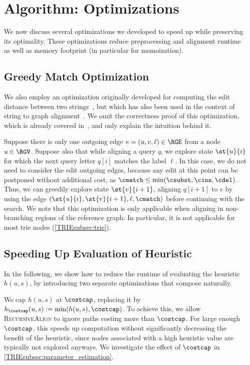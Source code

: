 \section{\astarix Algorithm: Optimizations} \label{TRIEsec:optimizations}
We now discuss several optimizations we developed to speed up \astarix while
preserving its optimality. These optimizations reduce preprocessing and
alignment runtime as well as memory footprint (in particular for memoization).



\subsection{Greedy Match Optimization} \label{TRIEsubsec:greedy}
We also employ an optimization originally developed for computing the edit
distance between two strings~\cite{sellers_algorithm_1974,allison_lazy_1992}, but
which has also been used in the context of string to graph
alignment~\cite{dox2018efficient}. We omit the correctness proof of this
optimization, which is already covered
in~\cite{sellers_algorithm_1974}, and only explain the intuition behind it.

Suppose there is only one outgoing edge $e = (u, v, \ell) \in \RGE$ from a node
$u \in \RGV$. Suppose also that while aligning a query $q$, we explore state
$\st{u}{i}$ for which the next query letter $q[i]$ matches the label $\ell$. In
this case, we do not need to consider the edit outgoing edges, because
any edit at this point can be postponed without additional cost, as $\cmatch
\leq \min(\csubst, \cins, \cdel)$. Thus, we can greedily explore state
$\st{v}{i+1}$, aligning $q[i+1]$ to $e$ by using the edge $(\st{u}{i},
\st{v}{i+1}, \ell, \cmatch)$ before continuing with the \A search.
We note that this optimization is only applicable when aligning in non-branching
regions of the reference graph. In particular, it is not applicable for most
trie nodes (\cref{TRIEsubsec:trie}).

\subsection{Speeding Up Evaluation of Heuristic} \label{TRIEsubsec:speedup-heuristic}
In the following, we show how to reduce the runtime of evaluating the heuristic
$h(u,s)$, by introducing two separate optimizations that compose naturally.

 We cap $h(u,s)$ at $\costcap$, replacing it by
$h_{\costcap}(u,s):=\min(h(u,s),\costcap)$. To achieve this, we allow
\textsc{RecursiveAlign} to ignore paths costing more than $\costcap$.
%
For large enough $\costcap$, this speeds up computation without significantly
decreasing the benefit of the heuristic, since nodes associated with a high
heuristic value are typically not explored anyways. We investigate the effect of
$\costcap$ in \cref{TRIEsubsec:parameter_estimation}.

